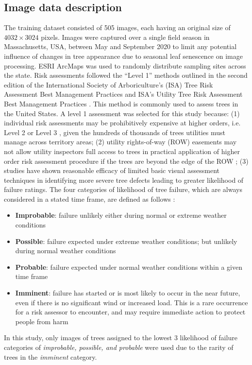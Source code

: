 \documentclass[Journal, letterpaper]{ascelike-new}
\newcommand{\?}{\stackrel{?}{=}}
\begin{document}
\subsection{Image data description}
The training dataset consisted of 505 images, each having an original size of $4032\times3024$ pixels.   Images were captured over a single field season in Massachusetts, USA, between May and September 2020 to limit any potential influence of changes in tree appearance due to seasonal leaf senescence on image processing.  ESRI ArcMaps was used to randomly distribute sampling sites across the state.  Risk assessments followed the “Level 1” methods outlined in the second edition of the International Society of Arboriculture’s (ISA) Tree Risk Assessment Best Management Practices \cite{e.thomassmiley2017best} and ISA’s Utility Tree Risk Assessment Best Management Practices \cite{johnw.goodfellow2020best}.  This method is commonly used to assess trees in the United States.  A level 1 assessment was selected for this study because: (1) individual risk assessments may be prohibitively expensive at higher orders, i.e. Level 2 or Level 3 \cite{e.thomassmiley2017best}, given the hundreds of thousands of trees utilities must manage across territory areas;  (2) utility rights-of-way (ROW) easements may not allow utility inspectors full access to trees in practical application of higher order risk assessment procedure if the trees are beyond the edge of the ROW \cite{johnw.goodfellow2020best}; (3) studies have shown reasonable efficacy of limited basic visual assessment techniques in identifying more severe tree defects \cite{rooney2005reliability,koeser2016frequency} leading to greater likelihood of failure ratings.  The four categories of likelihood of tree failure, which are always considered in a stated time frame, are defined as follows \cite{e.thomassmiley2017best}:
\begin{itemize}
\item \textbf{Improbable}: failure unlikely either during normal or extreme weather conditions 
\item \textbf{Possible}: failure expected under extreme weather conditions; but unlikely during normal weather conditions
\item \textbf{Probable}: failure expected under normal weather conditions within a given time frame
\item \textbf{Imminent}: failure has started or is most likely to occur in the near future, even if there is no significant wind or increased load. This is a rare occurrence for a risk assessor to encounter, and may require immediate action to protect people from harm
\end{itemize}
	In this study, only images of trees assigned to the lowest 3 likelihood of failure categories of \textit{improbable, possible, \textit{and} probable} were used due to the rarity of trees in the \textit{imminent} category.    
\end{document}
